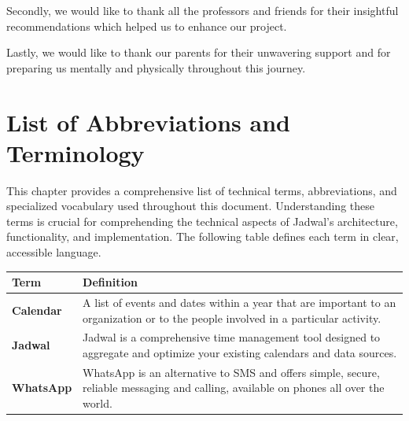 \documentclass[12pt,a4paper,twoside]{report}
\begin{document}
\begin{singlespace}
\begin{justify}
        Secondly, we would like to thank all the professors and friends for their insightful recommendations which helped us to enhance our project.

        Lastly, we would like to thank our parents for their unwavering support and for preparing us mentally and physically throughout this journey.
    \end{justify}

    \newpage

    \tableofcontents

    \listoffigures

    \listoftables

    \chapter*{List of Abbreviations and Terminology}

    This chapter provides a comprehensive list of technical terms, abbreviations, and specialized vocabulary used throughout this document. Understanding these terms is crucial for comprehending the technical aspects of Jadwal's architecture, functionality, and implementation. The following table defines each term in clear, accessible language.

    \begin{center}
        \begin{longtable}{p{}p{}}
            \toprule
            \textbf{Term}             & \textbf{Definition}                                                                                                                                                          \\
            \midrule
            \endhead

            \textbf{Calendar}         & A list of events and dates within a year that are important to an organization or to the people involved in a particular activity. \cite{def:calendar}                       \\[1ex]

            \textbf{Jadwal}           & Jadwal is a comprehensive time management tool designed to aggregate and optimize your existing calendars and data sources.                                                  \\[1ex]

            \textbf{WhatsApp}         & WhatsApp is an alternative to SMS and offers simple, secure, reliable messaging and calling, available on phones all over the world. \cite{whatsapp-about}                   \\[1ex]


\end{longtable}
\end{center}
\end{singlespace}
\end{document}

